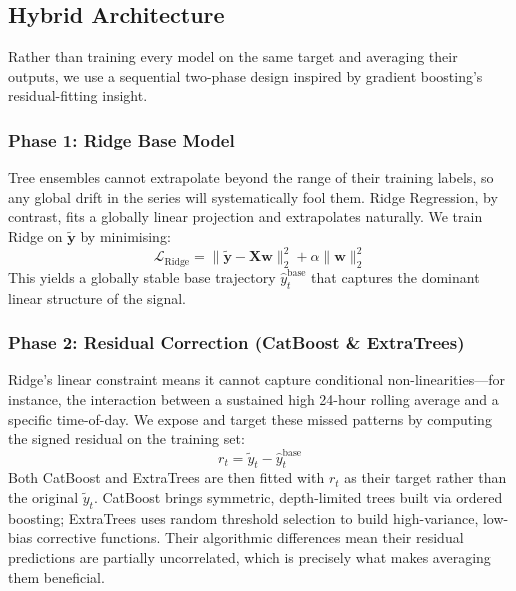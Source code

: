 \documentclass[conference]{IEEEtran}
\begin{document}
  \subsection{Hybrid Architecture}

  Rather than training every model on the same target and averaging their outputs,
  we use a sequential two-phase design inspired by gradient boosting's residual-fitting
  insight.

  \subsubsection{Phase 1: Ridge Base Model}

  Tree ensembles cannot extrapolate beyond the range of their training labels, so any
  global drift in the series will systematically fool them. Ridge Regression, by
  contrast, fits a globally linear projection and extrapolates naturally. We train Ridge
  on $\tilde{\mathbf{y}}$ by minimising:
  \begin{equation}
    \mathcal{L}_{\text{Ridge}}= \|\tilde{\mathbf{y}} - \mathbf{X}\mathbf{w}\|_{2}^{2} + \alpha \|\mathbf{w}\|_{2}^{2}
  \end{equation}
  This yields a globally stable base trajectory $\hat{y}^{\text{base}}_{t}$ that
  captures the dominant linear structure of the signal.

  \subsubsection{Phase 2: Residual Correction (CatBoost \& ExtraTrees)}

  Ridge's linear constraint means it cannot capture conditional non-linearities---for
  instance, the interaction between a sustained high 24-hour rolling average and a
  specific time-of-day. We expose and target these missed patterns by computing the
  signed residual on the training set:
  \begin{equation}
    r_{t} = \tilde{y}_{t} - \hat{y}^{\text{base}}_{t}
  \end{equation}
  Both CatBoost and ExtraTrees are then fitted with $r_{t}$ as their target rather
  than the original $\tilde{y}_{t}$. CatBoost brings symmetric, depth-limited trees
  built via ordered boosting; ExtraTrees uses random threshold selection to build
  high-variance, low-bias corrective functions. Their algorithmic differences mean
  their residual predictions are partially uncorrelated, which is precisely what
  makes averaging them beneficial.
\end{document}
